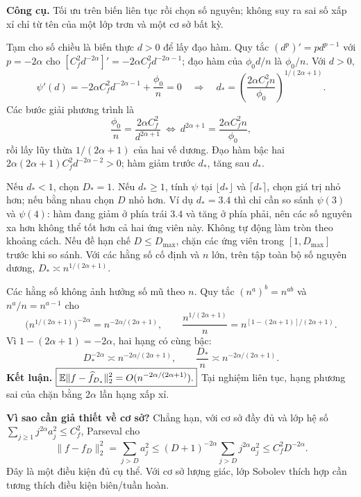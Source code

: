 \textbf{Công cụ.} Tối ưu trên biến liên tục rồi chọn số nguyên;
không suy ra sai số xấp xỉ chỉ từ tên của một lớp trơn và một cơ sở bất kỳ.

Tạm cho số chiều là biến thực $d>0$ để lấy đạo hàm.
Quy tắc $(d^p)'=pd^{p-1}$ với $p=-2\alpha$ cho
$[C_f^2d^{-2\alpha}]'=-2\alpha C_f^2d^{-2\alpha-1}$;
đạo hàm của $\phi_0d/n$ là $\phi_0/n$.
Với $d>0$,
\[
\psi'(d)=-2\alpha C_f^2d^{-2\alpha-1}+\frac{\phi_0}{n}=0
\quad\Longrightarrow\quad
d_*=\left(\frac{2\alpha C_f^2n}{\phi_0}\right)^{1/(2\alpha+1)}.
\]
Các bước giải phương trình là
\[
\frac{\phi_0}{n}=\frac{2\alpha C_f^2}{d^{2\alpha+1}}
\ \Longleftrightarrow\ d^{2\alpha+1}=\frac{2\alpha C_f^2n}{\phi_0},
\]
rồi lấy lũy thừa $1/(2\alpha+1)$ của hai vế dương.
Đạo hàm bậc hai
$2\alpha(2\alpha+1)C_f^2d^{-2\alpha-2}>0$;
hàm giảm trước $d_*$, tăng sau $d_*$.

Nếu $d_*<1$, chọn $D_*=1$.
Nếu $d_*\geq1$, tính $\psi$ tại $\lfloor d_*\rfloor$ và $\lceil d_*\rceil$,
chọn giá trị nhỏ hơn; nếu bằng nhau chọn $D$ nhỏ hơn.
Ví dụ $d_*=3.4$ thì chỉ cần so sánh $\psi(3)$ và $\psi(4)$:
hàm đang giảm ở phía trái $3.4$ và tăng ở phía phải, nên các số nguyên xa hơn
không thể tốt hơn cả hai ứng viên này. Không tự động làm tròn theo khoảng cách.
Nếu đề hạn chế $D\leq D_{\max}$, chặn các ứng viên trong $[1,D_{\max}]$ trước khi so sánh.
Với các hằng số cố định và $n$ lớn, trên tập toàn bộ số nguyên dương,
$D_*\asymp n^{1/(2\alpha+1)}$.

Các hằng số không ảnh hưởng số mũ theo $n$.
Quy tắc $(n^a)^b=n^{ab}$ và $n^a/n=n^{a-1}$ cho
\[
\bigl(n^{1/(2\alpha+1)}\bigr)^{-2\alpha}
=n^{-2\alpha/(2\alpha+1)},\qquad
\frac{n^{1/(2\alpha+1)}}n
=n^{[1-(2\alpha+1)]/(2\alpha+1)}.
\]
Vì $1-(2\alpha+1)=-2\alpha$, hai hạng có cùng bậc:
\[
D_*^{-2\alpha}\asymp n^{-2\alpha/(2\alpha+1)},\qquad
\frac{D_*}{n}\asymp n^{-2\alpha/(2\alpha+1)}.
\]
\textbf{Kết luận.} $\boxed{\mathbb E\|f-\widehat f_{D_*}\|_2^2
=O(n^{-2\alpha/(2\alpha+1)}).}$
Tại nghiệm liên tục, hạng phương sai của chặn bằng $2\alpha$ lần hạng xấp xỉ.

\textbf{Vì sao cần giả thiết về cơ sở?} Chẳng hạn, với cơ sở đầy đủ và lớp hệ số
$\sum_{j\geq1}j^{2\alpha}a_j^2\leq C_f^2$, Parseval cho
\[
\|f-f_D\|_2^2=\sum_{j>D}a_j^2
\leq(D+1)^{-2\alpha}\sum_{j>D}j^{2\alpha}a_j^2
\leq C_f^2D^{-2\alpha}.
\]
Đây là một điều kiện đủ cụ thể. Với cơ sở lượng giác, lớp Sobolev thích hợp
cần tương thích điều kiện biên/tuần hoàn.

